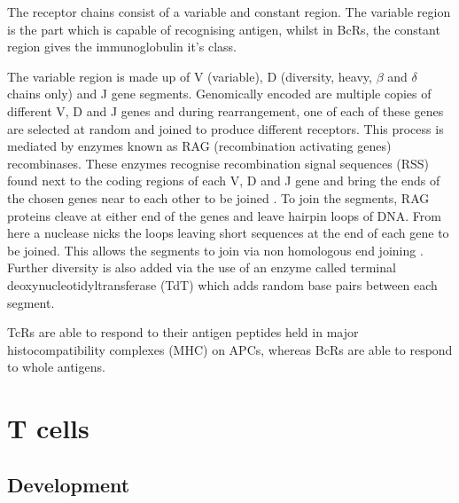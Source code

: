 The receptor chains consist of a variable and constant region.
The variable region is the part which is capable of recognising antigen, whilst in BcRs, the constant region gives the immunoglobulin it's class.

The variable region is made up of V (variable), D (diversity, heavy, $\beta$ and $\delta$ chains only) and J gene segments.
Genomically encoded are multiple copies of different V, D and J genes and during rearrangement, one of each of these genes are selected at random and joined to produce different receptors.
This process is mediated by enzymes known as RAG (recombination activating genes) recombinases.
These enzymes recognise recombination signal sequences (RSS) found next to the coding regions of each V, D and J gene and bring the ends of the chosen genes near to each other to be joined \citep{Fugmann2014, Oettinger1999}.
To join the segments, RAG proteins cleave at either end of the genes and leave hairpin loops of DNA.
From here a nuclease nicks the loops leaving short sequences at the end of each gene to be joined.
This allows the segments to join via non homologous end joining \citep{Schatz2011}.
Further diversity is also added via the use of an enzyme called terminal deoxynucleotidyltransferase (TdT) which adds random base pairs between each segment.

TcRs are able to respond to their antigen peptides held in major histocompatibility complexes (MHC) on APCs, whereas BcRs are able to respond to whole antigens.





\section{T cells}



\subsection{Development}
\label{subsec:Tcelldevelopment}

